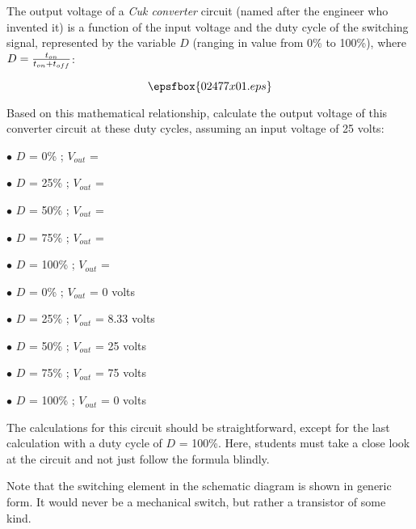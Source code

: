 

The output voltage of a {\it Cuk converter} circuit (named after the engineer who invented it) is a function of the input voltage and the duty cycle of the switching signal, represented by the variable $D$ (ranging in value from 0\% to 100\%), where $D = {{t_{on}} \over {t_{on} + t_{off}}}$:


$$\epsfbox{02477x01.eps}$$

Based on this mathematical relationship, calculate the output voltage of this converter circuit at these duty cycles, assuming an input voltage of 25 volts:

\medskip
\goodbreak
\item{$\bullet$} $D$ = 0\% ; $V_{out}$ = 
\item{$\bullet$} $D$ = 25\% ; $V_{out}$ =
\item{$\bullet$} $D$ = 50\% ; $V_{out}$ =
\item{$\bullet$} $D$ = 75\% ; $V_{out}$ =
\item{$\bullet$} $D$ = 100\% ; $V_{out}$ =
\medskip







\medskip
\goodbreak
\item{$\bullet$} $D$ = 0\% ; $V_{out}$ = 0 volts
\item{$\bullet$} $D$ = 25\% ; $V_{out}$ = 8.33 volts
\item{$\bullet$} $D$ = 50\% ; $V_{out}$ = 25 volts
\item{$\bullet$} $D$ = 75\% ; $V_{out}$ = 75 volts
\item{$\bullet$} $D$ = 100\% ; $V_{out}$ = 0 volts
\medskip







The calculations for this circuit should be straightforward, except for the last calculation with a duty cycle of $D$ = 100\%.  Here, students must take a close look at the circuit and not just follow the formula blindly.  

Note that the switching element in the schematic diagram is shown in generic form.  It would never be a mechanical switch, but rather a transistor of some kind.

